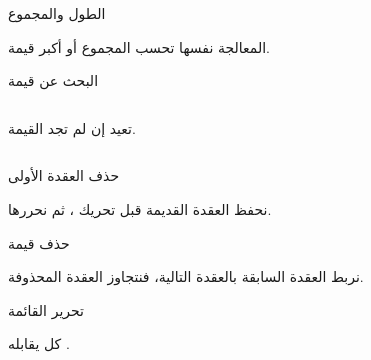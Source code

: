 \documentclass[aspectratio=169, 11pt, t, xcolor={table}]{beamer}
\begin{document}
\begin{frame}{الطول والمجموع}
    \begin{center}
    \begin{minipage}{0.72\textwidth}
    \end{minipage}
    \end{center}
    \vspace{0.3cm}
    المعالجة نفسها تحسب المجموع أو أكبر قيمة.
\end{frame}

\begin{frame}[t]{البحث عن قيمة}
    \begin{columns}[T]
        {\small {} تعيد  إن لم تجد القيمة.\par}
    \end{columns}
\end{frame}

\begin{frame}{حذف العقدة الأولى}
    \begin{center}
    \begin{minipage}{0.72\textwidth}
    \end{minipage}
    \end{center}
    \vspace{0.3cm}
    نحفظ العقدة القديمة قبل تحريك ، ثم نحررها.
\end{frame}

\begin{frame}{حذف قيمة}
    \begin{center}
    \begin{minipage}{0.72\textwidth}
    \end{minipage}
    \end{center}
    \vspace{0.3cm}
    نربط العقدة السابقة بالعقدة التالية، فنتجاوز العقدة المحذوفة.
\end{frame}

\begin{frame}{تحرير القائمة}
    \begin{center}
    \begin{minipage}{0.72\textwidth}
    \end{minipage}
    \end{center}
    \vspace{0.3cm}
    كل  يقابله .
\end{frame}
\end{document}
